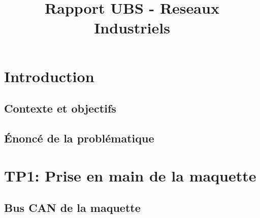 \documentclass{rapportECC}
\title{Rapport UBS - Reseaux Industriels} %
\begin{document}





        
\fairemarges %
\fairepagedegarde %
\tabledematieres %



\section{Introduction} 

\subsection{Contexte et objectifs}

\subsection{Énoncé de la problématique}

\section{TP1: Prise en main de la maquette}

\subsection{Bus CAN de la maquette}
\end{document}
